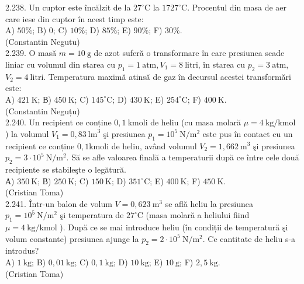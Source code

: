 \documentclass[10pt]{article}
\begin{document}
2.238. Un cuptor este încălzit de la $27^{\circ} \mathrm{C}$ la $1727^{\circ} \mathrm{C}$. Procentul din masa de aer care iese din cuptor în acest timp este:\\ A) $50 \%$; B) 0; C) $10 \%$; D) $85 \%$; E) $90 \%$; F) $30 \%$.\\ (Constantin Negutu)\\

2.239. O masă $m=10 \mathrm{~g}$ de azot suferă o transformare în care presiunea scade liniar cu volumul din starea cu $p_{1}=1 \mathrm{~atm}, V_{1}=8 \mathrm{~litri}$, în starea cu $p_{2}=3 \mathrm{~atm}$, $V_{2}=4 \mathrm{~litri}$. Temperatura maximă atinsă de gaz în decursul acestei transformări este:\\ A) $421 \mathrm{~K}$; В) $450 \mathrm{~K}$; C) $145^{\circ} \mathrm{C}$; D) $430 \mathrm{~K}$; E) $254^{\circ} \mathrm{C}$; F) $400 \mathrm{~K}$.\\ (Constantin Neguțu)\\

2.240. Un recipient ce conține $0,1 \mathrm{~kmoli}$ de heliu (cu masa molară $\mu=4 \mathrm{~kg} / \mathrm{kmol}$ ) la volumul $V_{1}=0,83 \mathrm{~lm}^{3}$ şi presiunea $p_{1}=10^{5} \mathrm{~N} / \mathrm{m}^{2}$ este pus în contact cu un recipient ce conține $0,1 \mathrm{kmoli}$ de heliu, având volumul $V_{2}=1,662 \mathrm{~m}^{3}$ şi presiunea $p_{2}=3 \cdot 10^{5} \mathrm{~N} / \mathrm{m}^{2}$. Să se afle valoarea finală a temperaturii după ce între cele două recipiente se stabileşte o legătură.\\ А) $350 \mathrm{~K}$; В) $250 \mathrm{~K}$; C) $150 \mathrm{~K}$; D) $351^{\circ} \mathrm{C}$; E) $400 \mathrm{~K}$; F) $450 \mathrm{~K}$.\\ (Cristian Toma)\\

2.241. Într-un balon de volum $V=0,623 \mathrm{~m}^{3}$ se află heliu la presiunea $p_{1}=10^{5} \mathrm{~N} / \mathrm{m}^{2}$ şi temperatura de $27^{\circ} \mathrm{C}$ (masa molară a heliului fiind $\mu=4 \mathrm{~kg} / \mathrm{kmol}$ ). După ce se mai introduce heliu (în condiții de temperatură şi volum constante) presiunea ajunge la $p_{2}=2 \cdot 10^{5} \mathrm{~N} / \mathrm{m}^{2}$. Ce cantitate de heliu s-a introdus?\\ A) $1 \mathrm{~kg}$; B) $0,01 \mathrm{~kg}$; C) $0,1 \mathrm{~kg}$; D) $10 \mathrm{~kg}$; E) $10 \mathrm{~g}$; F) $2,5 \mathrm{~kg}$.\\ (Cristian Toma)\\
\end{document}

